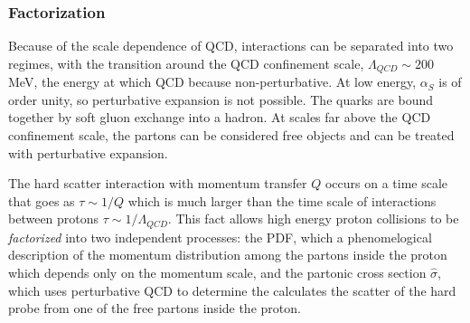 \subsubsection{Factorization}


Because of the scale dependence of QCD, interactions can be separated into two regimes, with the transition around the QCD confinement scale, $\Lambda_{QCD} \sim 200$ MeV, the energy at which QCD because non-perturbative. At low energy, $\alpha_S$ is of order unity, so perturbative expansion is not possible. The quarks are bound together by soft gluon exchange into a hadron. At scales far above the QCD confinement scale, the partons can be considered free objects and can be treated with perturbative expansion.

The hard scatter interaction with momentum transfer $Q$ occurs on a time scale that goes as $\tau \sim 1/Q$ which is much larger than the time scale of interactions between protons $\tau \sim 1/\Lambda_{QCD}$. This fact allows high energy proton collisions to be \textit{factorized} into two independent processes: the PDF, which a phenomelogical description of the momentum distribution among the partons inside the proton which depends only on the momentum scale, and the partonic cross section $\hat{\sigma}$, which uses perturbative QCD to determine the calculates the scatter of the hard probe from one of the free partons inside the proton.



